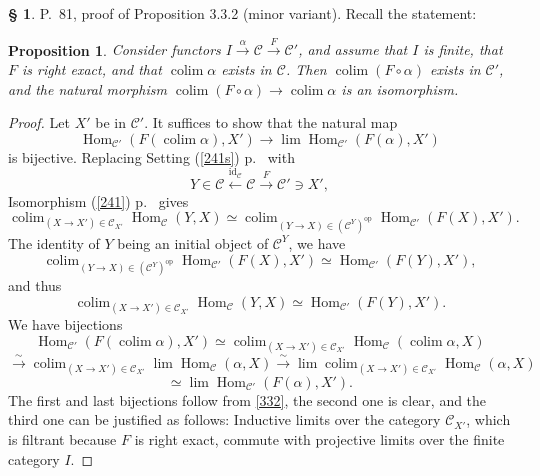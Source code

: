 \documentclass[12pt]{article}%
\newtheorem{prop}[thm]{Proposition}
\theoremstyle{remark}
\theoremstyle{definition}
\newtheorem{s}[thm]{\S}%
\newcommand{\C}{\mathcal C}
\newcommand{\xr}{\xrightarrow}
\DeclareMathOperator*{\colim}{colim}%
\DeclareMathOperator{\id}{id}
\DeclareMathOperator{\Hom}{Hom}%
\DeclareMathOperator{\op}{op}
\begin{document}
\begin{s} 
P.~81, proof of Proposition 3.3.2 (minor variant). Recall the statement:

\begin{prop} 
Consider functors $I\xrightarrow\alpha\C\xrightarrow F\C'$, and assume that $I$ is finite, that $F$ is right exact, and that $\colim\alpha$ exists in $\C$. Then $\colim(F\circ\alpha)$ exists in $\C'$, and the natural morphism $\colim(F\circ\alpha)\to\colim\alpha$ is an isomorphism. 
\end{prop} 

\begin{proof}
Let $X'$ be in $\C'$. It suffices to show that the natural map 
$$
\Hom_{\C'}(F(\colim\alpha),X')\to\lim\Hom_{\C'}(F(\alpha),X')
$$ 
is bijective. Replacing Setting (\ref{241s}) p.~\pageref{241s} with 
$$
Y\in\C\xleftarrow{\id_\C}\C\xrightarrow{F}\C'\ni X', 
$$ 
Isomorphism (\ref{241}) p.~\pageref{241} gives 
$$
\colim_{(X\to X')\in\C_{X'}}\Hom_\C(Y,X)\simeq\colim_{(Y\to X)\in(\C^Y)^{\op}}\Hom_{\C'}(F(X),X').
$$ 
The identity of $Y$ being an initial object of $\C^Y$, we have 
$$
\colim_{(Y\to X)\in(\C^Y)^{\op}}\Hom_{\C'}(F(X),X')\simeq\Hom_{\C'}(F(Y),X'),
$$ 
and thus
%
\begin{equation}\label{332} 
\colim_{(X\to X')\in\C_{X'}}\Hom_\C(Y,X)\simeq\Hom_{\C'}(F(Y),X').
\end{equation} 
%
We have bijections 
$$ 
\Hom_{\C'}(F(\colim\alpha),X')\simeq\colim_{(X\to X')\in\C_{X'}}\Hom_\C(\colim\alpha,X)
$$
$$
\xr\sim\colim_{(X\to X')\in\C_{X'}}\lim\Hom_\C(\alpha,X)\xr\sim\lim\colim_{(X\to X')\in\C_{X'}}\Hom_\C(\alpha,X)
$$
$$
\simeq\lim\Hom_{\C'}(F(\alpha),X'). 
$$ 
The first and last bijections follow from \eqref{332}, the second one is clear, and the third one can be justified as follows: Inductive limits over the category $\C_{X'}$, which is filtrant because $F$ is right exact, commute with projective limits over the finite category $I$.
\end{proof}
\end{s}

%
\end{document}
